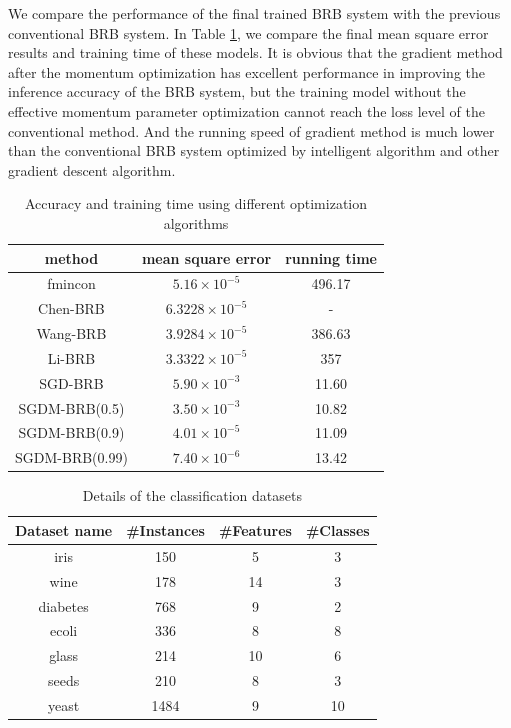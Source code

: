 \documentclass{ieeeaccess}
\begin{document}
We compare the performance of the final trained BRB system with the previous conventional BRB system.
In Table \ref{tab3}, we compare the final mean square error results and training time of these models.
It is obvious that the gradient method after the momentum optimization has excellent performance in improving the inference accuracy of the BRB system,
but the training model without the effective momentum parameter optimization cannot reach the loss level of the conventional method.
And the running speed of gradient method is much lower than the conventional BRB system optimized by intelligent algorithm and other gradient descent algorithm.

\begin{table}
    \caption{Accuracy and training time using different optimization algorithms}
    \centering
    \label{tab3}
    \begin{tabular}{ccc}
        \hline
        method         & mean square error     & running time \\
        \hline
        fmincon        & $5.16\times10^{-5}$   & 496.17       \\
        Chen-BRB       & $6.3228\times10^{-5}$ & -            \\
        Wang-BRB       & $3.9284\times10^{-5}$ & 386.63       \\
        Li-BRB         & $3.3322\times10^{-5}$ & 357          \\
        SGD-BRB        & $5.90\times10^{-3}$   & 11.60        \\
        SGDM-BRB(0.5)  & $3.50\times10^{-3}$   & 10.82        \\
        SGDM-BRB(0.9)  & $4.01\times10^{-5}$   & 11.09        \\
        SGDM-BRB(0.99) & $7.40\times10^{-6}$   & 13.42        \\
        \hline
    \end{tabular}
\end{table}

\begin{table}
    \caption{Details of the classification datasets}
    \centering
    \label{tab4}
    \begin{tabular}{cccc}
        \hline
        Dataset name & \#Instances & \#Features & \#Classes \\
        \hline
        iris         & 150         & 5          & 3         \\
        wine         & 178         & 14         & 3         \\
        diabetes     & 768         & 9          & 2         \\
        ecoli        & 336         & 8          & 8         \\
        glass        & 214         & 10         & 6         \\
        seeds        & 210         & 8          & 3         \\
        yeast        & 1484        & 9          & 10        \\
        \hline
    \end{tabular}
\end{table}
\end{document}
